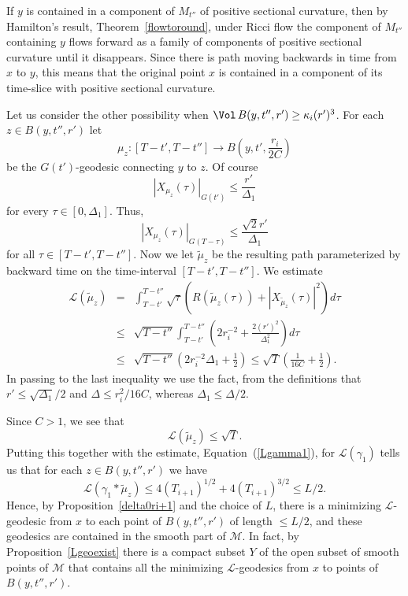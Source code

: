 If $y$ is contained in a component of $M_{t''}$ of positive sectional curvature, then by
  Hamilton's result, Theorem~\ref{flowtoround},
under Ricci flow the component of $M_{t''}$  containing $y$ flows forward as
a family of  components of positive sectional curvature until it disappears. Since there is path moving backwards in time
from $x$ to $y$, this means that the original point $x$ is contained
in a component of its time-slice with positive sectional curvature.

Let us consider the other possibility when $\Vol\,B(y,t'',r')\ge
\kappa_i(r')^3$.
 For each $z\in B(y,t'',r')$ let
 $$\mu_z\colon [T-t',T-t'']\to  B(y,t',\frac{r_i}{2C})$$ be
 the $G(t')$-geodesic connecting $y$ to $z$. Of course
 $$|X_{\mu_z}(\tau)|_{G(t')}\le \frac{r'}{\Delta_1}$$
 for every $\tau\in [0,\Delta_1]$. Thus,
 $$|X_{\mu_z}(\tau)|_{G(T-\tau)}\le
 \frac{\sqrt{2}r'}{\Delta_1}$$ for all $\tau\in [T-t',T-t'']$.
 Now we let $\tilde \mu_z$ be the resulting path parameterized by backward time
 on the time-interval $[T-t',T-t'']$.
 We estimate
 \begin{eqnarray*}{\mathcal
 L}(\tilde \mu_z) & = &
 \int_{T-t'}^{T-t''}\sqrt{\tau}\left(R(\tilde\mu_z(\tau))+|X_{\tilde\mu_z}(\tau)|^2\right)d\tau
 \\
& \le & \sqrt{T-t''}\int_{T-t'}^{T-t''}\left(2 r_i^{-2}+\frac{2(r')^2}{\Delta_1^2}\right)d\tau
\\
& \le & \sqrt{T-t''}(2r_i^{-2}\Delta_1+\frac{1}{2}) \le
\sqrt{T}\left(\frac{1}{16C}+\frac{1}{2}\right).
\end{eqnarray*}
In passing to the last inequality we use the fact, from the
definitions that $r'\le \sqrt{\Delta_1}/2$ and $\Delta\le
r_i^2/16C$, whereas $\Delta_1\le \Delta/2$.

Since $C>1$, we see that
$${\mathcal L}(\tilde \mu_z)\le \sqrt{T}.$$
Putting this together with the estimate, Equation~(\ref{Lgamma1}),
for ${\mathcal L}(\gamma_1)$ tells us that for each $z\in
B(y,t'',r')$ we have
$${\mathcal L}(\gamma_1*\tilde\mu_z)\le
4(T_{i+1})^{1/2}+4(T_{i+1})^{3/2}\le L/2.$$ Hence, by
Proposition~\ref{delta0ri+1} and the choice of $L$, there is a
minimizing ${\mathcal L}$-geodesic from $x$ to each point of
$B(y,t'',r')$ of length $\le L/2$, and these geodesics are contained
in the smooth part of ${\mathcal M}$. In fact, by
Proposition~\ref{Lgeoexist} there is a compact subset $Y$ of
the open subset of smooth points of ${\mathcal M}$ that contains all
the minimizing ${\mathcal L}$-geodesics from $x$ to points of
$B(y,t'',r')$.

